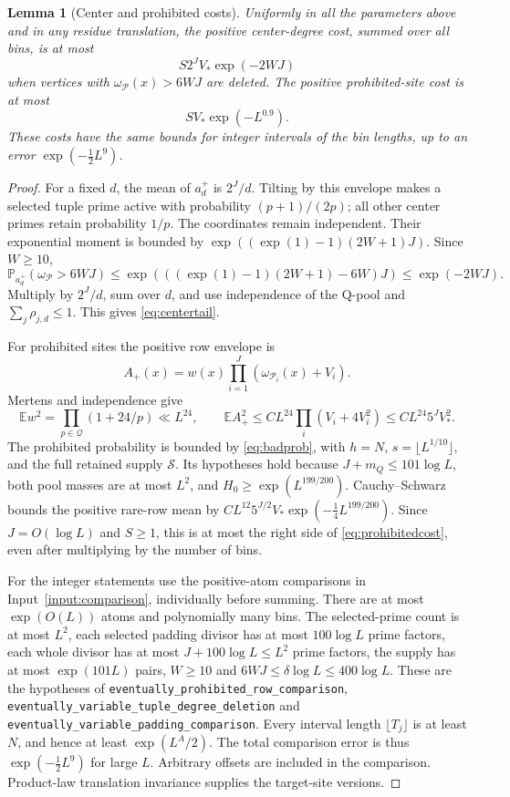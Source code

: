 \documentclass[11pt]{article}
\newtheorem{lemma}[theorem]{Lemma}
\theoremstyle{definition}
\newcommand{\E}{\mathbb E}
\newcommand{\Prob}{\mathbb P}
\newcommand{\leanname}[1]{\nolinkurl{#1}}
\begin{document}
\begin{lemma}[Center and prohibited costs]\label{lem:rare}
Uniformly in all the parameters above and in any residue translation,
the positive center-degree cost, summed over all bins, is at most
\begin{equation}\label{eq:centertail}
 S2^JV_*\exp(-2WJ)
\end{equation}
when vertices with $\omega_{\mathcal P}(x)>6WJ$ are deleted.
The positive prohibited-site cost is at most
\begin{equation}\label{eq:prohibitedcost}
 SV_*\exp(-L^{0.9}).
\end{equation}
These costs have the same bounds for integer intervals of the bin
lengths, up to an error $\exp(-\tfrac12L^9)$.
\end{lemma}
\begin{proof}
For a fixed $d$, the mean of $a_d^+$ is $2^J/d$.
Tilting by this envelope makes a selected tuple prime active with
probability $(p+1)/(2p)$; all other center primes retain probability
$1/p$. The coordinates remain independent.
Their exponential moment is bounded by
$\exp((\exp(1)-1)(2W+1)J)$.
Since $W\ge10$,
\[
 \Prob_{a_d^+}(\omega_{\mathcal P}>6WJ)
 \le\exp(((\exp(1)-1)(2W+1)-6W)J)
 \le\exp(-2WJ).
\]
Multiply by $2^J/d$, sum over $d$, and use independence of the Q-pool
and $\sum_j\rho_{j,d}\le1$. This gives \eqref{eq:centertail}.

For prohibited sites the positive row envelope is
\[
 A_+(x)=w(x)\prod_{i=1}^J
             (\omega_{\mathcal P_i}(x)+V_i).
\]
Mertens and independence give
\[
 \E w^2=\prod_{p\in\mathcal Q}(1+24/p)\ll L^{24},\qquad
 \E A_+^2\le C L^{24}\prod_i(V_i+4V_i^2)
                  \le C L^{24}5^J V_*^2.
\]
The prohibited probability is bounded by \eqref{eq:badprob}, with
$h=N$, $s=\lfloor L^{1/10}\rfloor$, and the full retained supply
$\mathcal S$. Its hypotheses hold because
$J+m_Q\le101\log L$, both pool masses are at most $L^2$, and
$H_0\ge\exp(L^{199/200})$.
Cauchy--Schwarz bounds the positive rare-row mean by
$C L^{12}5^{J/2}V_*\exp(-\tfrac14L^{199/200})$.
Since $J=O(\log L)$ and $S\ge1$, this is at most the right side of
\eqref{eq:prohibitedcost}, even after multiplying by the number of bins.

For the integer statements use the positive-atom comparisons in
Input~\ref{input:comparison}, individually before summing.
There are at most $\exp(O(L))$ atoms and polynomially many bins.
The selected-prime count is at most $L^2$, each selected padding divisor
has at most $100\log L$ prime factors, each whole divisor has at most
$J+100\log L\le L^2$ prime factors, the supply has at most
$\exp(101L)$ pairs, $W\ge10$ and
$6WJ\le\delta\log L\le400\log L$. These are the hypotheses of
\leanname{eventually_prohibited_row_comparison},
\leanname{eventually_variable_tuple_degree_deletion} and
\leanname{eventually_variable_padding_comparison}.
Every interval length $\lfloor T_j\rfloor$ is at least $N$, and hence
at least $\exp(L^A/2)$.
The total comparison error is thus $\exp(-\tfrac12L^9)$ for large $L$.
Arbitrary offsets are included in the comparison. Product-law
translation invariance supplies the target-site versions.
\end{proof}
\end{document}
